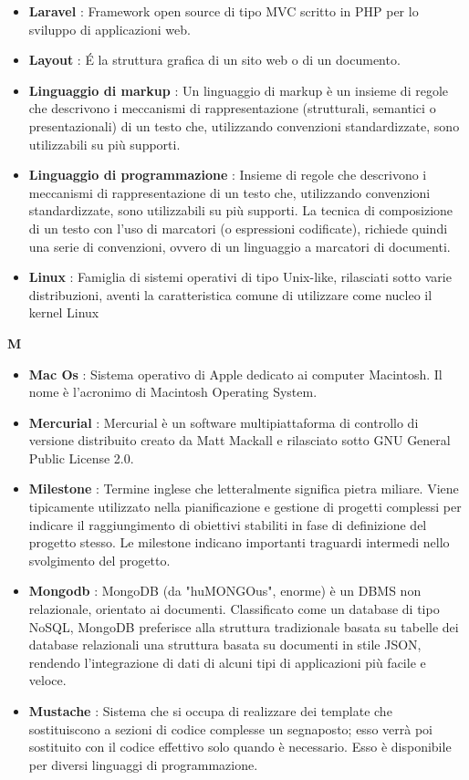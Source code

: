 \begin{flushleft}
\begin{itemize}[label={}]
\item \textbf{Laravel} : Framework open source di tipo MVC scritto in PHP per lo sviluppo di applicazioni web.
\item \textbf{Layout} : \'E la struttura grafica di un sito web o di un documento.
\item \textbf{Linguaggio di markup} : Un linguaggio di markup è un insieme di regole che descrivono i meccanismi di rappresentazione (strutturali, semantici o presentazionali) di un testo che, utilizzando convenzioni standardizzate, sono utilizzabili su più supporti.
\item \textbf{Linguaggio di programmazione} : Insieme di regole che descrivono i meccanismi di rappresentazione di un testo che, utilizzando convenzioni standardizzate, sono utilizzabili su più supporti. La tecnica di composizione di un testo con l'uso di marcatori (o espressioni codificate), richiede quindi una serie di convenzioni, ovvero di un linguaggio a marcatori di documenti.
\item \textbf{Linux} : Famiglia di sistemi operativi di tipo Unix-like, rilasciati sotto varie distribuzioni, aventi la caratteristica comune di utilizzare come nucleo il kernel Linux
\end{itemize}
\end{flushleft}
\newpage
{\huge \textbf{M}}
\begin{flushleft}
\begin{itemize}[label={}]
\item \textbf{Mac Os} : Sistema operativo di Apple dedicato ai computer Macintosh. Il nome è l'acronimo di Macintosh Operating System.
\item \textbf{Mercurial} : Mercurial è un software multipiattaforma di controllo di versione distribuito creato da Matt Mackall e rilasciato sotto GNU General Public License 2.0.
\item \textbf{Milestone} : Termine inglese che letteralmente significa pietra miliare. Viene tipicamente utilizzato nella pianificazione e gestione di progetti complessi per indicare il raggiungimento di obiettivi stabiliti in fase di definizione del progetto stesso. Le milestone indicano importanti traguardi intermedi nello svolgimento del progetto.
\item \textbf{Mongodb} : MongoDB (da "huMONGOus", enorme) è un DBMS non relazionale, orientato ai documenti. Classificato come un database di tipo NoSQL, MongoDB preferisce alla struttura tradizionale basata su tabelle dei database relazionali una struttura basata su documenti in stile JSON, rendendo l'integrazione di dati di alcuni tipi di applicazioni più facile e veloce.
\item \textbf{Mustache} : Sistema che si occupa di realizzare dei template che sostituiscono a sezioni di codice complesse un segnaposto; esso verrà poi sostituito con il codice effettivo solo quando è necessario. Esso è disponibile per diversi linguaggi di programmazione.
\end{itemize}
\end{flushleft}
